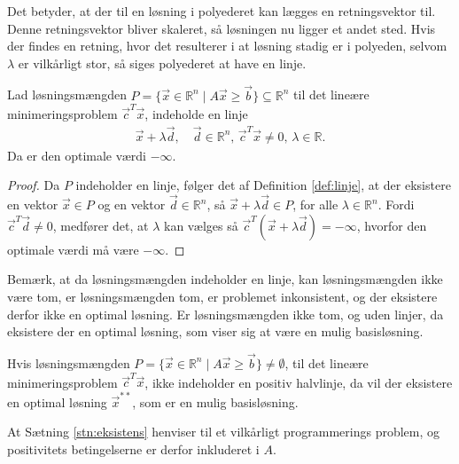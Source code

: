 Det betyder, at der til en løsning i polyederet kan lægges en retningsvektor til.
Denne retningsvektor bliver skaleret, så løsningen nu ligger et andet sted. 
Hvis der findes en retning, hvor det resulterer i at løsning stadig er i polyeden, selvom $\lambda$ er vilkårligt stor, så siges polyederet at have en linje.
\begin{prop}
Lad løsningsmængden $P = \{ \vec{x} \in \mathds{R}^n\mid A \vec{x} \geq \vec{b} \} \subseteq \mathds{R}^n $  til det lineære minimeringsproblem $\vec{c}^T\vec{x}$, indeholde en linje
\begin{align*}
\vec{x} + \lambda \vec{d}, \quad \vec{d}\in \mathds{R}^n, \, \vec{c}^T\vec{x} \neq 0, \, \lambda \in \mathds{R}.
\end{align*}
Da er den optimale værdi $-\infty$.
\end{prop}
\begin{proof}
Da $P$ indeholder en linje, følger det af Definition \ref{def:linje}, at der eksistere en vektor $\vec{x} \in P$ og en vektor $\vec{d} \in \mathds{R}^n$, så $\vec{x}+\lambda \vec{d} \in P$, for alle $\lambda \in \mathds{R}^n$. 
Fordi $\vec{c}^T\vec{d}\neq 0$, medfører det, at $\lambda$ kan vælges så $\vec{c}^T(\vec{x}+\lambda\vec{d}) = - \infty$, hvorfor den optimale værdi må være $-\infty$.
\end{proof}
Bemærk, at da løsningsmængden indeholder en linje, kan løsningsmængden ikke være tom, er løsningsmængden tom, er problemet inkonsistent, og der eksistere derfor ikke en optimal løsning. 
Er løsningsmængden ikke tom, og uden linjer, da eksistere der en optimal løsning, som viser sig at være en mulig basisløsning.
\begin{stn}
Hvis løsningsmængden $P =\{\vec{x} \in \mathds{R}^n\mid A \vec{x} \geq \vec{b} \} \neq \emptyset$, til det lineære minimeringsproblem $\vec{c}^T\vec{x}$, ikke indeholder en positiv halvlinje, da vil der eksistere en optimal løsning $\vec{x}^{**}$, som er en mulig basisløsning.
\label{stn:eksistens}
\end{stn}

\begin{bem}
At Sætning \ref{stn:eksistens} henviser til et vilkårligt programmerings problem, og positivitets betingelserne er derfor inkluderet i $A$.
\end{bem}

